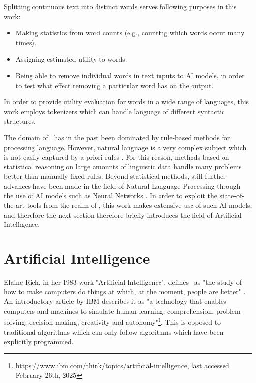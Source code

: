 Splitting continuous text into distinct words serves following purposes in this work:
\begin{itemize}
	\item Making statistics from word counts (e.g., counting which words occur many times).
	\item Assigning estimated utility to words.
	\item Being able to remove individual words in text inputs to AI models, in order to test what effect removing a particular word has on the output.
\end{itemize}

In order to provide utility evaluation for words in a wide range of languages, this work employs tokenizers which can handle language of different syntactic structures.

The domain of \NLP\ has in the past been dominated by rule-based methods for processing language.
However, natural language is a very complex subject which is not easily captured by a priori rules \cite{jurafskySpeechLanguageProcessing2025a}.
For this reason, methods based on statistical reasoning on large amounts of linguistic data handle many problems better than manually fixed rules.
Beyond statistical methods, still further advances have been made in the field of Natural Language Processing through the use of AI models such as Neural Networks \cite{jurafskySpeechLanguageProcessing2025a}.
In order to exploit the state-of-the-art tools from the realm of \NLP, this work makes extensive use of such AI models, and therefore the next section therefore briefly introduces the field of Artificial Intelligence.

\section{Artificial Intelligence}
Elaine Rich, in her 1983 work "Artificial Intelligence", defines \AI\ as "the study of how to make computers do things at which, at the moment, people are better" \cite{rich1983artificial}.
An introductory article by IBM describes it as "a technology that enables computers and machines to simulate human learning, comprehension, problem-solving, decision-making, creativity and autonomy"\footnote{\url{https://www.ibm.com/think/topics/artificial-intelligence}, last accessed February 26th, 2025}.
This is opposed to traditional algorithms which can only follow algorithms which have been explicitly programmed.

